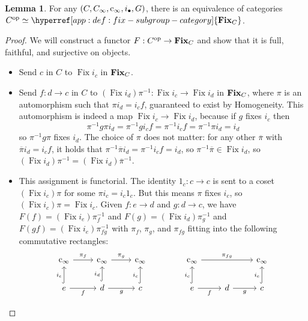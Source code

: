 \documentclass[
  sigconf,
  screen, ]{acmart}
\theoremstyle{definition}
\newtheorem{lemma}[theorem]{Lemma}
\newcommand\nref[2]{\hyperref[#1]{#2}} \newcommand\checkhigh{{\huge{\color{red}\textbf{TODO: check}}}}
\newcommand\Fix{\operatorname{Fix}}
\newcommand\cinfty{{{\rm c}_\infty}}
\newcommand\subgrpcat{{\bf Fix}}
\begin{document}
\begin{lemma} \label{app:lem:fix-subgroup-equiv}
   For any  $(C,C_\infty,\cinfty,i_\bullet,G)$,
   there is an equivalence of categories
   $C^{\rm op} \simeq \nref{app:def:fix-subgroup-category}{\subgrpcat_C}$.
\end{lemma}
\begin{proof}
  We will construct a functor $F : C^{\rm op}\to \subgrpcat_C$
  and show that it is full, faithful, and surjective on objects.
  \begin{itemize}
  \item Send $c$ in $C$ to $\Fix i_c$ in $\subgrpcat_C$.
  \item Send $f : d\to c$ in $C$ to $(\Fix i_d)\pi^{-1} : \Fix{i_c}\to \Fix{i_d}$ in $\subgrpcat_C$,
    where $\pi$ is an automorphism
    such that $\pi i_d = i_c f$,
    guaranteed to exist by Homogeneity.
    This automorphism is indeed a map $\Fix{i_c}\to \Fix{i_d}$,
    because if $g$ fixes $i_c$
    then
    \[ \pi^{-1} g \pi i_d = \pi^{-1} g i_c f = \pi^{-1} i_c f 
    = \pi^{-1} \pi i_d  = i_d\]
    so $\pi^{-1} g \pi$ fixes $i_d$.
    The choice of $\pi$ does not matter:
    for any other $\overline\pi$ with $\overline\pi i_d = i_c f$,
    it holds that $\pi^{-1}\overline\pi i_d = \pi^{-1} i_c f = i_d$,
    so $\pi^{-1}\overline\pi\in\Fix i_d$,
    so $(\Fix i_d)\pi^{-1} = (\Fix i_d)\overline\pi^{-1}$.
  \item This assignment is functorial.
    The identity $1_c : c\to c$ is sent to
    a coset $(\Fix {i_c})\pi$ for some $\pi i_c = i_c 1_c$.
    But this means $\pi$ fixes $i_c$, so $(\Fix{i_c})\pi = \Fix{i_c}$.
    Given $f : e\to d$ and $g : d\to c$,
    we have $F(f) = (\Fix {i_e})\pi_f^{-1}$
    and $F(g) = (\Fix {i_d}) \pi_g^{-1}$
    and $F(gf) = (\Fix{i_e}) \pi_{fg}^{-1}$
    with $\pi_f$, $\pi_g$, and $\pi_{fg}$ fitting into the following commutative rectangles:
    \[\begin{tikzcd}
    \cinfty \arrow[r, "\pi_f"]               & \cinfty \arrow[r, "\pi_g"]               & \cinfty                  \\
    e \arrow[r, "f"'] \arrow[u, "i_e", hook] & d \arrow[r, "g"'] \arrow[u, "i_d", hook] & c \arrow[u, "i_c", hook]
    \end{tikzcd}
    \qquad\qquad
\begin{tikzcd}
    \cinfty \arrow[rr, "\pi_{fg}"]           &                   & \cinfty                  \\
    e \arrow[r, "f"'] \arrow[u, "i_c", hook] & d \arrow[r, "g"'] & c \arrow[u, "i_e", hook]

\end{tikzcd}\]
\end{itemize}
\end{proof}
\end{document}
